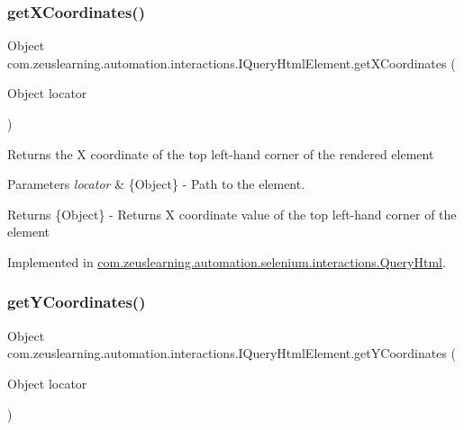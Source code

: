 \subsubsection{\texorpdfstring{get\+X\+Coordinates()}{getXCoordinates()}}
{\footnotesize\ttfamily Object com.\+zeuslearning.\+automation.\+interactions.\+I\+Query\+Html\+Element.\+get\+X\+Coordinates (\begin{DoxyParamCaption}\item[{Object}]{locator }\end{DoxyParamCaption})}

Returns the X coordinate of the top left-\/hand corner of the rendered element


\begin{DoxyParams}{Parameters}
{\em locator} & \{Object\} -\/ Path to the element. \\
\hline
\end{DoxyParams}
\begin{DoxyReturn}{Returns}
\{Object\} -\/ Returns X coordinate value of the top left-\/hand corner of the element 
\end{DoxyReturn}


Implemented in \hyperlink{classcom_1_1zeuslearning_1_1automation_1_1selenium_1_1interactions_1_1QueryHtml_a093e239edd8567248e9407a4cef24474}{com.\+zeuslearning.\+automation.\+selenium.\+interactions.\+Query\+Html}.

\hypertarget{interfacecom_1_1zeuslearning_1_1automation_1_1interactions_1_1IQueryHtmlElement_a7fa59044cee483ac710d06186d46776c}{}\label{interfacecom_1_1zeuslearning_1_1automation_1_1interactions_1_1IQueryHtmlElement_a7fa59044cee483ac710d06186d46776c} 
\subsubsection{\texorpdfstring{get\+Y\+Coordinates()}{getYCoordinates()}}
{\footnotesize\ttfamily Object com.\+zeuslearning.\+automation.\+interactions.\+I\+Query\+Html\+Element.\+get\+Y\+Coordinates (\begin{DoxyParamCaption}\item[{Object}]{locator }\end{DoxyParamCaption})}

